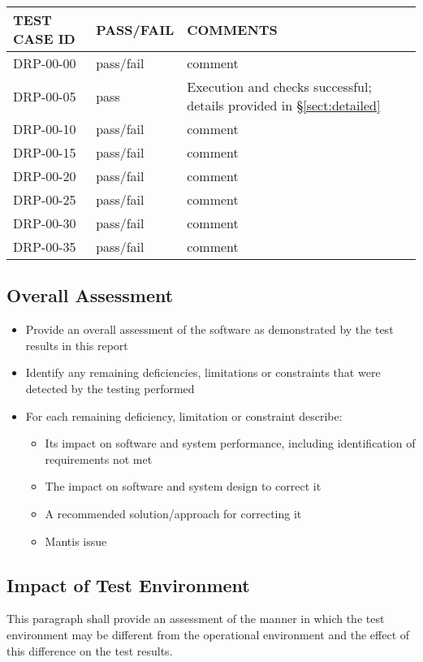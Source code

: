 \documentclass[DM,lsstdraft,STR,toc]{lsstdoc}
\begin{document}
\begin{longtable} {|p{}|p{}|p{}|}\hline
{\bf TEST CASE ID} & {\bf PASS/FAIL} & {\bf COMMENTS} \\\hline
DRP-00-00 & pass/fail & comment \\\hline
DRP-00-05 & pass & Execution and checks successful; details provided in \S\ref{sect:detailed} \\\hline
DRP-00-10 & pass/fail & comment \\\hline
DRP-00-15 & pass/fail & comment \\\hline
DRP-00-20 & pass/fail & comment \\\hline
DRP-00-25 & pass/fail & comment \\\hline
DRP-00-30 & pass/fail & comment \\\hline
DRP-00-35 & pass/fail & comment \\\hline
\end{longtable}


\subsection{Overall Assessment \label{sect:overallassessment}}
\begin{itemize}
\item Provide an overall assessment of the software as demonstrated by the test results in this report
\item Identify any remaining deficiencies, limitations or constraints that were detected by the testing performed
\item For each remaining deficiency, limitation or constraint describe:
\begin{itemize}
\item Its impact on software and system performance, including identification of requirements not met
\item The impact on software and system design to correct it
\item A recommended solution/approach for correcting it
\item Mantis issue
\end{itemize}
\end{itemize}

\subsection{Impact of Test Environment \label{sect:impact}}
This paragraph shall provide an assessment of the manner in which the test environment may be different from the
operational environment and the effect of this difference on the test results.
\end{document}

